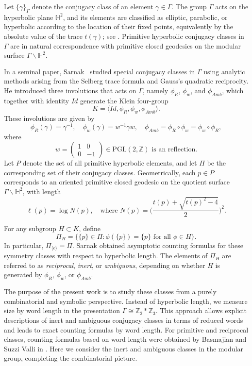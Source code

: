 \documentclass[a4paper,12pt]{amsart}
\numberwithin{equation}{section}
\theoremstyle{definition}
\numberwithin{equation}{section}
\begin{document}
Let $\{\gamma\}_\Gamma$ denote the conjugacy class of an element $\gamma \in \Gamma$. The group $\Gamma$ acts on the hyperbolic plane $\mathbb{H}^2$, and its elements are classified as elliptic, parabolic, or hyperbolic according to the location of their fixed points, equivalently by the absolute value of the trace $t(\gamma)$; see \cite{MR1177168}. Primitive hyperbolic conjugacy classes in $\Gamma$ are in natural correspondence with primitive closed geodesics on the modular surface $\Gamma \backslash \mathbb{H}^2$.

In a seminal paper, Sarnak~\cite{sarnak} studied special conjugacy classes in $\Gamma$ using analytic methods arising from the Selberg trace formula and Gauss's quadratic reciprocity. He introduced three involutions that acts on $\Gamma$, namely $\phi_R$, $\phi_w$, and $\phi_{Amb}$, which together with identity $Id$ generate the Klein four-group
\[
K=\langle Id, \phi_R, \phi_w, \phi_{Amb} \rangle.
\]
These involutions are given by 
\[
\phi_R(\gamma) = \gamma^{-1}, \quad 
\phi_w(\gamma) = w^{-1} \gamma w, \quad 
\phi_{Amb} = \phi_R \circ \phi_w = \phi_w \circ \phi_R,
\]  
where  
\[
w = \begin{pmatrix} 1 & 0 \\ 0 & -1 \end{pmatrix} \in \mathrm{PGL}(2, \mathbb{Z}) \text{ is an reflection}.
\]  
Let $P$ denote the set of all primitive hyperbolic elements, and let $\Pi$ be the corresponding set of their conjugacy classes. Geometrically, each $p \in P$ corresponds to an oriented primitive closed geodesic on the quotient surface $\Gamma \backslash \mathbb{H}^2$, with length  
\[
\ell(p) = \log N(p), \quad \text{where } 
N(p) = \bigg(\frac{t(p) + \sqrt{t(p)^2 - 4}}{2}\bigg)^2.
\]

For any subgroup $H \subset K$, define  
\[
\Pi_H = \{\{p\} \in \Pi : \phi(\{p\}) = \{p\} \text{ for all } \phi \in H\}.
\]  
In particular, $\Pi_{\langle e \rangle} = \Pi$. Sarnak obtained asymptotic counting formulas for these symmetry classes with respect to hyperbolic length. The elements of $\Pi_H$ are referred to as \emph{reciprocal}, \emph{inert}, or \emph{ambiguous}, depending on whether $H$ is generated by $\phi_R$, $\phi_w$, or $\phi_{Amb}$.

The purpose of the present work is to study these classes from a purely combinatorial and symbolic perspective. Instead of hyperbolic length, we measure size by word length in the presentation $\Gamma \cong \mathbb{Z}_2 * \mathbb{Z}_3$. This approach allows explicit descriptions of inert and ambiguous conjugacy classes in terms of reduced words and leads to exact counting formulas by word length. For primitive and reciprocal classes, counting formulas based on word length were obtained by Basmajian and Suzzi Valli in \cite{combigrowth}. Here we consider the inert and ambiguous classes in the modular group, completing the combinatorial picture.
\end{document}
